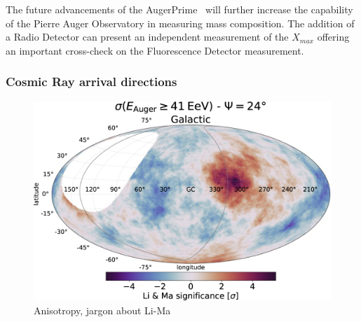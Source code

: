 The future advancements of the AugerPrime~\cite{ANASTASI2022167497} will further increase the capability of the Pierre Auger Observatory in measuring mass composition. The addition of a Radio Detector can present an independent measurement of the $X_{max}$ offering an important cross-check on the Fluorescence Detector measurement. 

\subsubsection*{Cosmic Ray arrival directions}
\label{subsubsec:CRdirec}
\begin{figure}[t!]
  \centering
  \includegraphics[width=14.5cm]{thesis_figures/CRnNu/apjac7d4ef1_hr.jpg}
  \caption{Anisotropy, jargon about Li-Ma~\cite{Abreu_2022}}
  \label{fig:CR-anisotropy}
\end{figure}

